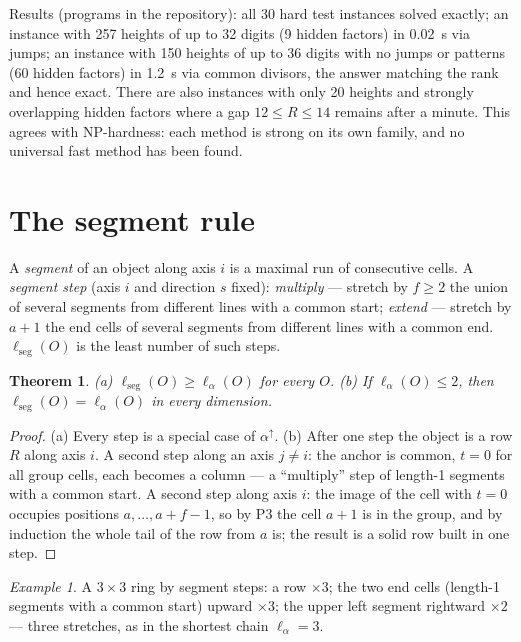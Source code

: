 \documentclass[11pt,a4paper]{article}
\theoremstyle{plain}
\newtheorem{theorem}{Theorem}[section]
\theoremstyle{definition}
\theoremstyle{remark}
\newtheorem*{example}{Example}
\newcommand{\lseg}{\ell_{\mathrm{seg}}}
\begin{document}
Results (programs in the repository): all 30 hard test instances solved exactly; an instance with 257 heights of up to 32 digits (9 hidden factors) in 0.02~s via jumps; an instance with 150 heights of up to 36 digits with no jumps or patterns (60 hidden factors) in 1.2~s via common divisors, the answer matching the rank and hence exact. There are also instances with only 20 heights and strongly overlapping hidden factors where a gap $12\le R\le14$ remains after a minute. This agrees with NP-hardness: each method is strong on its own family, and no universal fast method has been found.

\section{The segment rule}\label{sec:seg}

A \emph{segment} of an object along axis $i$ is a maximal run of consecutive cells. A \emph{segment step} (axis $i$ and direction $s$ fixed): \emph{multiply} — stretch by $f\ge2$ the union of several segments from different lines with a common start; \emph{extend} — stretch by $a+1$ the end cells of several segments from different lines with a common end. $\lseg(O)$ is the least number of such steps.

\begin{theorem}\label{thm:seg}
(a) $\lseg(O)\ge\ell_\alpha(O)$ for every $O$. (b) If $\ell_\alpha(O)\le2$, then $\lseg(O)=\ell_\alpha(O)$ in every dimension.
\end{theorem}
\begin{proof}
(a) Every step is a special case of $\alpha^\uparrow$. (b) After one step the object is a row $R$ along axis $i$. A second step along an axis $j\ne i$: the anchor is common, $t=0$ for all group cells, each becomes a column — a ``multiply'' step of length-1 segments with a common start. A second step along axis $i$: the image of the cell with $t=0$ occupies positions $a,\dots,a+f-1$, so by P3 the cell $a+1$ is in the group, and by induction the whole tail of the row from $a$ is; the result is a solid row built in one step.
\end{proof}

\begin{example}
A $3\times3$ ring by segment steps: a row $\times3$; the two end cells (length-1 segments with a common start) upward $\times3$; the upper left segment rightward $\times2$ — three stretches, as in the shortest chain $\ell_\alpha=3$.
\end{example}
\end{document}

